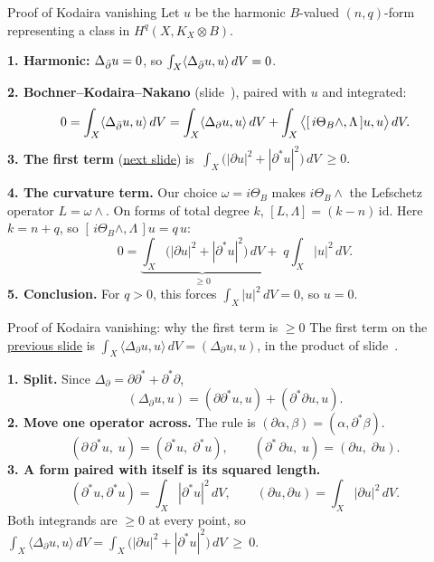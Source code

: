 \begin{frame}{Proof of Kodaira vanishing}
\label{fr:kv-proof}
Let \(u\) be the harmonic \(B\)-valued \((n,q)\)-form representing a class in \(H^q(X,K_X\otimes B)\).
\par
\textbf{1. Harmonic:} \(\Delta_{\bar\partial}u=0\), so \(\int_X\langle\Delta_{\bar\partial}u,u\rangle\,dV=0\).
\par
\textbf{2. Bochner--Kodaira--Nakano} (slide~\hyperlink{fr:the-bochner-kodaira-nakano-15}{\pageref{fr:the-bochner-kodaira-nakano-15}}), paired with \(u\) and integrated:
\[
0=\int_X\langle\Delta_{\bar\partial}u,u\rangle\,dV
=\int_X\langle\Delta_{\partial}u,u\rangle\,dV
+\int_X\big\langle[\,i\Theta_B\wedge,\Lambda\,]u,u\big\rangle\,dV .
\]
\textbf{3. The first term} (\hyperlink{fr:first-term}{next slide}) is
\(\ \int_X\bigl(|\partial u|^2+|\partial^*u|^2\bigr)\,dV\ \ge0 .\)
\par
\textbf{4. The curvature term.} Our choice \(\omega=i\Theta_B\) makes \(i\Theta_B\wedge\) the Lefschetz operator \(L=\omega\wedge\). On forms of total degree \(k\), \([L,\Lambda]=(k-n)\,\mathrm{id}\). Here \(k=n+q\), so \([\,i\Theta_B\wedge,\Lambda\,]u=q\,u\):
\[
0=\underbrace{\int_X\bigl(|\partial u|^2+|\partial^*u|^2\bigr)\,dV}_{\ge0}
+\;q\int_X|u|^2\,dV .
\]
\textbf{5. Conclusion.} For \(q>0\), this forces \(\int_X|u|^2\,dV=0\), so \(u=0\).
\end{frame}

\begin{frame}{Proof of Kodaira vanishing: why the first term is \(\ge0\)}
\label{fr:first-term}
The first term on the \hyperlink{fr:kv-proof}{previous slide} is \(\displaystyle\int_X\langle\Delta_{\partial}u,u\rangle\,dV=(\Delta_{\partial}u,u)\), in the product of slide~\hyperlink{fr:hodge-theory-with-values-14}{\pageref{fr:hodge-theory-with-values-14}}.
\par\medskip
\textbf{1. Split.} Since \(\Delta_{\partial}=\partial\partial^*+\partial^*\partial\),
\[
(\Delta_{\partial}u,u)=(\partial\partial^*u,u)+(\partial^*\partial u,u).
\]
\textbf{2. Move one operator across.} The rule is \((\partial\alpha,\beta)=(\alpha,\partial^*\beta)\).
\[
(\partial\,\partial^*u,\;u)=(\partial^*u,\;\partial^*u),
\qquad
(\partial^*\,\partial u,\;u)=(\partial u,\;\partial u).
\]
\textbf{3. A form paired with itself is its squared length.}
\[
(\partial^*u,\partial^*u)=\int_X|\partial^*u|^2\,dV,
\qquad
(\partial u,\partial u)=\int_X|\partial u|^2\,dV.
\]
Both integrands are \(\ge0\) at every point, so
\(\displaystyle\int_X\langle\Delta_{\partial}u,u\rangle\,dV=\int_X\bigl(|\partial u|^2+|\partial^*u|^2\bigr)\,dV\ \ge\ 0.\)
\end{frame}

